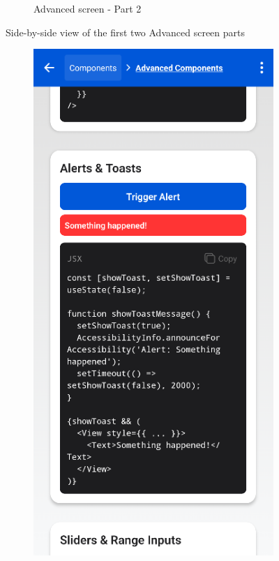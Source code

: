 \begin{enumerate}
\begin{itemize}
\begin{figure}[ht]
\begin{subfigure}[b]{0.48\textwidth}
                \caption{Advanced screen - Part 2}
                \label{fig:advanced-right1}
            \end{subfigure}
            \caption{Side-by-side view of the first two Advanced screen parts}
            \label{fig:advanced_screens_sidebyside1}
        \end{figure}

        \begin{figure}[ht]
            \centering
            \begin{subfigure}[b]{0.48\textwidth}
                \centering
                \includegraphics[width=\linewidth, alt={Third part of the Advanced screen}]{img/advanced3.png}

\end{subfigure}
\end{figure}
\end{itemize}
\end{enumerate}
